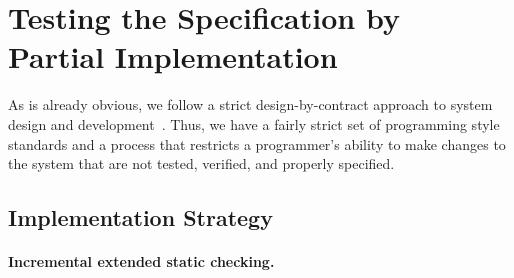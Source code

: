 \documentclass[letterpaper,twocolumn,10pt]{article}
\begin{document}
\section{Testing the Specification by \\ Partial Implementation}

As is already obvious, we follow a strict design-by-contract approach
to system design and development~\cite{Meyer92b}.  Thus, we have a
fairly strict set of programming style standards and a process that
restricts a programmer's ability to make changes to the system that
are not tested, verified, and properly specified.


\subsection{Implementation Strategy}


\paragraph{Incremental extended static checking.}

\end{document}
